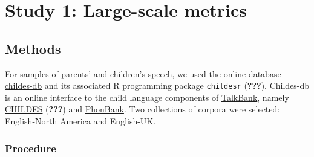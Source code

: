 \documentclass[man,floatsintext,draftall]{apa6}
\begin{document}
\section{Study 1: Large-scale
metrics}\label{study-1-large-scale-metrics}

\subsection{Methods}\label{methods}

For samples of parents' and children's speech, we used the online
database \href{childes-db.stanford.edu}{childes-db} and its associated R
programming package \texttt{childesr} ({\textbf{???}}). Childes-db is an
online interface to the child language components of
\href{https://talkbank.org/}{TalkBank}, namely
\href{https://childes.talkbank.org/}{CHILDES} ({\textbf{???}}) and
\href{https://phonbank.talkbank.org/}{PhonBank}. Two collections of
corpora were selected: English-North America and English-UK.

\subsubsection{Procedure}\label{procedure}
\end{document}

